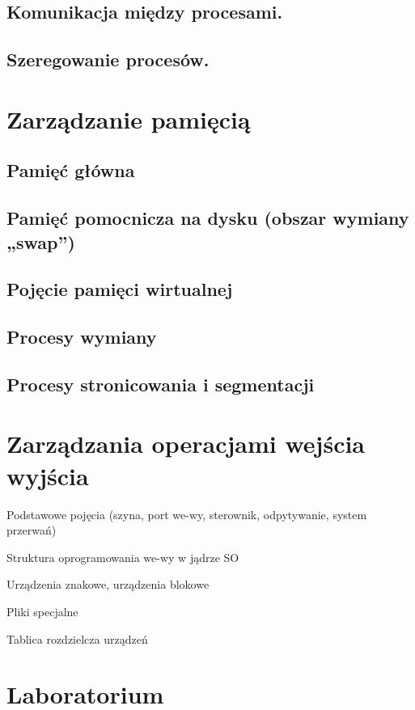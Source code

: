 \documentclass[11pt]{article}
\begin{document}
\subsection{Komunikacja między procesami.}

\subsection{Szeregowanie procesów.}

\section{Zarządzanie pamięcią}

\subsection{Pamięć główna}

\subsection{Pamięć pomocnicza na dysku (obszar wymiany „swap”)}

\subsection{Pojęcie pamięci wirtualnej}

\subsection{Procesy wymiany}

\subsection{Procesy stronicowania i segmentacji}

\section{Zarządzania operacjami wejścia wyjścia}

Podstawowe pojęcia (szyna, port we-wy, sterownik, odpytywanie, system przerwań)

Struktura oprogramowania we-wy w jądrze SO

Urządzenia znakowe, urządzenia blokowe

Pliki specjalne

Tablica rozdzielcza urządzeń

\section{Laboratorium}
\end{document}

